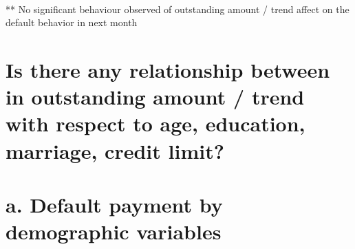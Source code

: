 \documentclass[11pt]{article}
\begin{document}
    \begin{center}
    \end{center}
    { \hspace*{\fill} \\}
    
    ** No significant behaviour observed of outstanding amount / trend
affect on the default behavior in next month

    \section{Is there any relationship between in outstanding amount / trend
with respect to age, education, marriage, credit
limit?}\label{is-there-any-relationship-between-in-outstanding-amount-trend-with-respect-to-age-education-marriage-credit-limit}

    \section{a. Default payment by demographic
variables}\label{a.-default-payment-by-demographic-variables}
\end{document}
